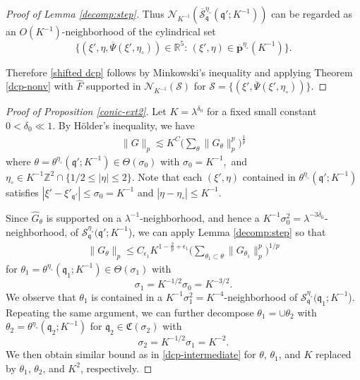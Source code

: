 \documentclass[10pt] %
{amsart}
\theoremstyle{plain}
\numberwithin{equation}{section}
\newcommand{\R}{\mathbb R}
\newcommand{\Z}{\mathbb Z}
\newcommand{\fq}{\mathfrak q}
\newcommand{\fm}{\mathfrak{q'}}
\begin{document}
\begin{proof}[Proof of Lemma \ref{decomp:step}]
Thus $\mathcal N_{K^{-1}}( \overline{\mathcal S}_{\fq} ^{\eta_\circ} (\fm;K^{-1}) )$ can be regarded as an $O(K^{-1})$-neighborhood of the cylindrical set   
\[
\Big\{ (\xi',\eta, \overline\Psi (\xi',\eta_\circ)) \in \R^5:\,  (\xi',\eta)\in \overline{\mathbf p}^{\eta_\circ}(K^{-1}) \Big\}  .
\]

Therefore \eqref{shifted dcp} follows by Minkowski's inequality and applying Theorem \ref{dcp-nonv} with $\widehat F$ supported in $\mathcal N_{K^{-1}} (\mathcal S)$ for $\mathcal S = \{ (\xi',\overline\Psi (\xi',\eta_\circ))\}$.    
\end{proof}



\begin{proof}[Proof of Proposition \ref{conic-ext2}]
Let $K=\lambda^{\delta_0}$ for a fixed small constant $0<\delta_0\ll 1$.
By H\"older's inequality, we have
\begin{align}\label{eq001}
\| G\|_p \lesssim K^C \Big(\sum_{\theta} \|G_{\theta}\|_p^p\Big)^{\frac 1p} 
\end{align}
where $\theta=\theta^{\eta_\circ}(\fm;K^{-1})\in \Theta(\sigma_0)$ with
$
\sigma_0=K^{-1},
$
and $\eta_\circ \in K^{-1}\Z^2\cap \{1/2\le |\eta|\le 2\}$.
Note that each $(\xi',\eta)$ contained in $\theta^{\eta_\circ}(\fm;K^{-1})$
satisfies $|\xi'-\xi'_\fm|\le \sigma_0=K^{-1}$ and $|\eta-\eta_\circ|\le K^{-1}$.

Since $\widehat G_\theta$ is supported on a $\lambda^{-1}$-neighborhood, and hence a $K^{-1}\sigma_0^2=\lambda^{-3\delta_0}$-neighborhood, of $\mathcal S_\fq^{\eta_\circ}(\fm;K^{-1}$),
we can apply Lemma \ref{decomp:step} so that 
\begin{align}\label{dcp-intermediate}
\| G_{\theta}\|_p \le C_{\epsilon_1} K^{1-\frac 2{p}+\epsilon_1} \Big( \sum_{\theta_1\subset\theta} \|G_{\theta_1}\|_p^p\Big)^{1/p}
\end{align}
for $\theta_1=\theta^{\eta_\circ}(\fq_1;K^{-1})\in \Theta(\sigma_1)$ with 
\[
\sigma_1=K^{-1/2}\sigma_0=K^{-3/2}.
\]
We observe that $\theta_1$ is contained in a $K^{-1}\sigma_1^2=K^{-4}$-neighborhood of $\mathcal S_\fq^{\eta_\circ}(\fq_1;K^{-1}$).
Repeating the same argument, we can further decompose $\theta_1=\cup \theta_2$ with $\theta_2=\theta^{\eta_\circ}(\fq_2;K^{-1})$ for $\fq_2\in \mathfrak C(\sigma_2)$ with
\[
\sigma_2=K^{-1/2}\sigma_1=K^{-2}.
\]
We then obtain similar bound as in \eqref{dcp-intermediate} for $\theta$, $\theta_1$, and $K$ replaced by $\theta_1$, $\theta_2$, and $K^2$, respectively.


\end{proof}
\end{document}
